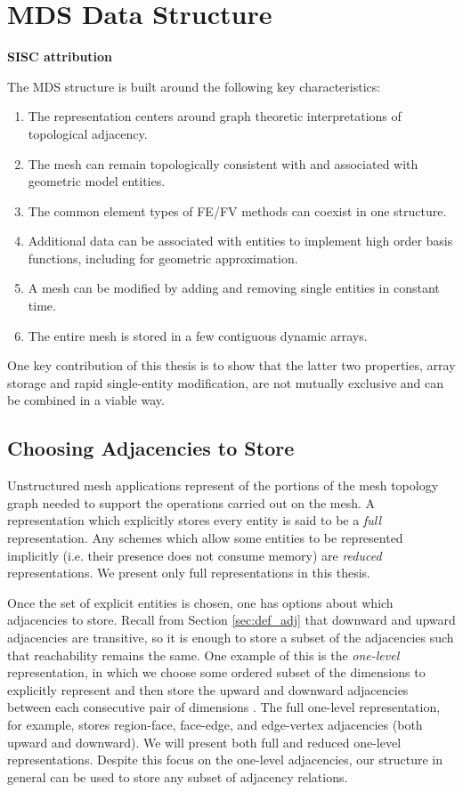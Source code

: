 \section{MDS Data Structure}
\label{sec:sisc}

{\bf SISC attribution}

The MDS structure is built around the following key characteristics:

\begin{enumerate}
\item The representation centers around graph theoretic interpretations
of topological adjacency.
\item The mesh can remain topologically consistent with and associated with
geometric model entities.
\item The common element types of FE/FV methods can coexist in one structure.
\item Additional data can be associated with entities to implement
high order basis functions, including for geometric approximation.
\item A mesh can be modified by adding and removing single entities in constant time.
\item The entire mesh is stored in a few contiguous dynamic arrays.
\end{enumerate}

One key contribution of this thesis is to show that the latter two properties,
array storage and rapid single-entity modification, are not mutually exclusive
and can be combined in a viable way.

\subsection{Choosing Adjacencies to Store}

Unstructured mesh applications represent
of the portions of the mesh topology graph
needed to support the operations carried out on the mesh.
A representation which explicitly stores
every entity is said to be a {\it full}
representation.
Any schemes which allow some entities to be represented
implicitly (i.e. their presence does not consume memory)
are {\it reduced} representations.
We present only full representations in this thesis.

Once the set of explicit entities is chosen, one has
options about which adjacencies to store.
Recall from Section \ref{sec:def_adj} that downward and upward
adjacencies are transitive, so it is enough to
store a subset of the adjacencies such that reachability
remains the same.
One example of this is the {\it one-level} representation,
in which we choose some ordered subset of the dimensions
to explicitly represent and then store the upward
and downward adjacencies between each consecutive
pair of dimensions \cite{beall1997general}.
The full one-level representation, for example, stores
region-face, face-edge, and edge-vertex adjacencies
(both upward and downward).
We will present both full and reduced one-level representations.
Despite this focus on the one-level adjacencies, our structure
in general can be used to store any subset of
adjacency relations.

